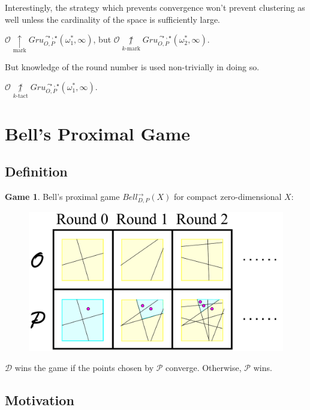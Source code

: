 \documentclass{beamer}
\theoremstyle{definition}
\newtheorem{game}[theorem]{Game}
\newcommand{\markwin}{\underset{\text{mark}}{\uparrow}}
\newcommand{\notkmarkwin}[1]{\underset{#1\text{-mark}}{\not\uparrow}}
\newcommand{\notktactwin}[1]{\underset{#1\text{-tact}}{\not\uparrow}}
\newcommand{\oneptcomp}[1]{#1^*}
\newcommand{\gruClusGameHard}[2]{Gru_{O,P}^{\leadsto,\star}\left({#1},{#2}\right)}
\newcommand{\bellAbsConGame}[1]{Bell_{D,P}^{\to}\left({#1}\right)}
\newcommand{\<}{\langle}
\renewcommand{\>}{\rangle}
\newcommand{\pl}[1]{\mathscr{#1}}
\begin{document}
\begin{frame}
  Interestingly, the strategy which prevents convergence won't
  prevent clustering as well unless the cardinality of the space is
  sufficiently large.

  \begin{theorem}
    $\pl O\markwin \gruClusGameHard{\oneptcomp\omega_1}{\infty}$, but
    $\pl O\notkmarkwin{k}\gruClusGameHard{\oneptcomp\omega_2}{\infty}$.
  \end{theorem}

  \pause

  But knowledge of the round number is used non-trivially in doing so.

  \begin{theorem}
    $\pl O\notktactwin{k}\gruClusGameHard{\oneptcomp\omega_1}{\infty}$.
  \end{theorem}
\end{frame}




\section{Bell's Proximal Game}

\subsection{Definition}

\begin{frame}
  \small
  \begin{game}
  Bell's proximal game $\bellAbsConGame{X}$ for compact zero-dimensional
  $X$:
    \begin{figure}
      \includegraphics[width=0.6\linewidth]{proximalGameAlt.pdf}
    \end{figure}

  $\pl D$ wins the game if the points chosen by $\pl P$ converge.
  Otherwise, $\pl P$ wins.
  \end{game}
\end{frame}

\subsection{Motivation}
\end{document}
